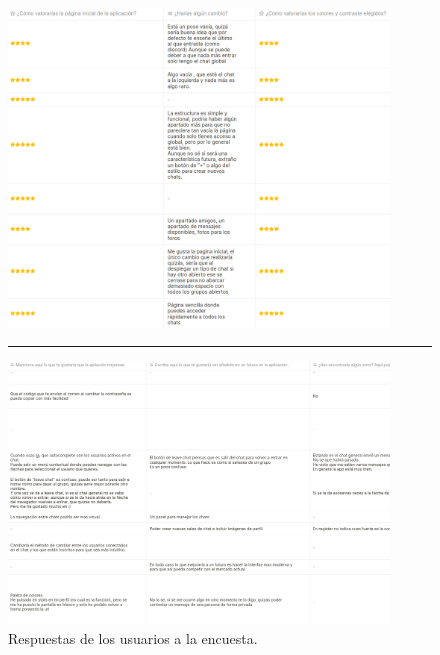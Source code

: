 \begin{itemize}
	\begin{figure}[h]
		\centering
		\includegraphics[width=0.9\textwidth]{res/images/resultados-encuesta-1}
		\vspace{1em}
		\hrule
		\vspace{1em}
		\includegraphics[width=0.9\textwidth]{res/images/resultados-encuesta-2}
		\caption{Respuestas de los usuarios a la encuesta.}
		\label{fig:resultados-encuesta}
	\end{figure}
\end{itemize}
